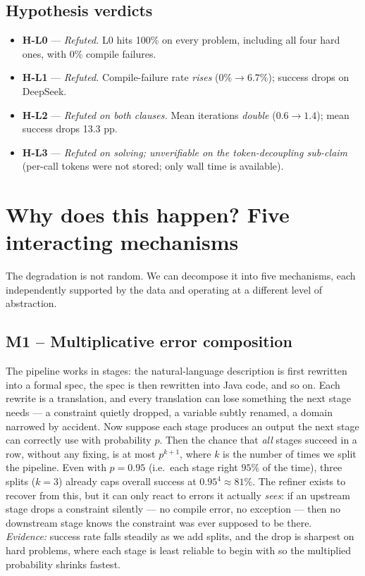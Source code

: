 \documentclass[11pt,a4paper]{article}
\begin{document}
\subsection{Hypothesis verdicts}
\begin{itemize}[leftmargin=1.2cm,itemsep=1pt,topsep=2pt]
\item \textbf{H-L0} --- \textit{Refuted.} L0 hits 100\% on every problem,
including all four hard ones, with $0\%$ compile failures.
\item \textbf{H-L1} --- \textit{Refuted.} Compile-failure rate \emph{rises}
($0\% \to 6.7\%$); success drops on DeepSeek.
\item \textbf{H-L2} --- \textit{Refuted on both clauses.} Mean iterations
\emph{double} ($0.6 \to 1.4$); mean success drops 13.3 pp.
\item \textbf{H-L3} --- \textit{Refuted on solving; unverifiable on the
token-decoupling sub-claim} (per-call tokens were not stored; only wall time
is available).
\end{itemize}

\section{Why does this happen? Five interacting mechanisms}

The degradation is not random. We can decompose it into five mechanisms,
each independently supported by the data and operating at a different level
of abstraction.

\subsection{M1 -- Multiplicative error composition}
The pipeline works in stages: the natural-language description is first
rewritten into a formal spec, the spec is then rewritten into Java code,
and so on. Each rewrite is a translation, and every translation can lose
something the next stage needs --- a constraint quietly dropped, a
variable subtly renamed, a domain narrowed by accident. Now suppose each
stage produces an output the next stage can correctly use with probability
$p$. Then the chance that \emph{all} stages succeed in a row, without any
fixing, is at most $p^{k+1}$, where $k$ is the number of times we split
the pipeline. Even with $p=0.95$ (i.e.\ each stage right $95\%$ of the
time), three splits ($k=3$) already caps overall success at
$0.95^4 \approx 81\%$. The refiner exists to recover from this, but it can
only react to errors it actually \emph{sees}: if an upstream stage drops
a constraint silently --- no compile error, no exception --- then no
downstream stage knows the constraint was ever supposed to be there.\\
\textit{Evidence:} success rate falls steadily as we add splits, and the
drop is sharpest on hard problems, where each stage is least reliable to
begin with so the multiplied probability shrinks fastest.
\end{document}
